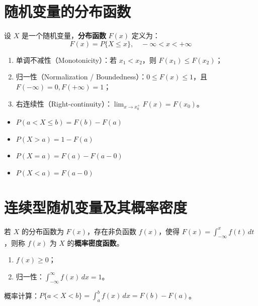 \section{随机变量的分布函数}
\begin{definition}[分布函数]
设 $X$ 是一个随机变量，\textbf{分布函数} $F(x)$ 定义为：
\begin{equation}
	F(x) = P\{X \le x\}, \quad -\infty < x < +\infty
	\label{eq:第二章:分布函数}
\end{equation}
\end{definition}

\begin{property}[分布函数的性质]
\begin{enumerate}
	\item 单调不减性（Monotonicity）：若 $x_1 < x_2$，则 $F(x_1) \le F(x_2)$；
	\item 归一性（Normalization / Boundedness）：$0 \le F(x) \le 1$，且 $F(-\infty) = 0, F(+\infty) = 1$；
	\item 右连续性（Right-continuity）：$\lim_{x \to x_0^+} F(x) = F(x_0)$。
\end{enumerate}
\end{property}

\begin{keybox}[分布函数常用公式]
\begin{itemize}
	\item $P(a < X \le b) = F(b) - F(a)$
	\item $P(X > a) = 1 - F(a)$
	\item $P(X = a) = F(a) - F(a-0)$
	\item $P(X < a) = F(a-0)$
\end{itemize}
\end{keybox}

\section{连续型随机变量及其概率密度}
\begin{definition}[概率密度函数]
若 $X$ 的分布函数为 $F(x)$，存在非负函数 $f(x)$，使得 $F(x) = \int_{-\infty}^{x} f(t)\,dt$，则称 $f(x)$ 为 $X$ 的\textbf{概率密度函数}。
\begin{enumerate}
	\item $f(x) \ge 0$；
	\item 归一性：$\int_{-\infty}^{\infty} f(x)\,dx = 1$。
\end{enumerate}
概率计算：$P\{a < X < b\} = \int_{a}^{b} f(x)\,dx = F(b) - F(a)$。
\end{definition}

